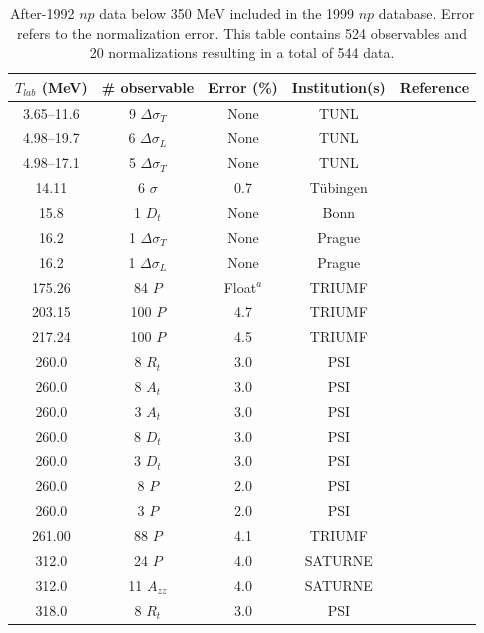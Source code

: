 \begin{table}
\caption{After-1992 $np$ data below 350 MeV included in the 1999 $np$ database.
Error refers to the normalization error. This table contains 524 observables
and 20 normalizations resulting in a total of 544 data.}
\begin{tabular}{ccccr}
                   
   $T_{lab}$ (MeV)
 & \# observable
 & Error (\%)
 & Institution(s)
 & Reference

\\
\hline                                                                          
3.65--11.6 & 9 $\Delta \sigma_T$ & None & TUNL & \cite{Wi95} \\
4.98--19.7 & 6 $\Delta \sigma_L$ & None & TUNL & \cite{Ra99} \\
4.98--17.1 & 5 $\Delta \sigma_T$ & None & TUNL & \cite{Ra99} \\
14.11      & 6 $\sigma$ & 0.7  & T\"ubingen & \cite{BM97} \\
15.8       & 1 $D_t$ & None & Bonn & \cite{Cl98} \\
16.2       & 1 $\Delta \sigma_T$ & None & Prague & \cite{Br96} \\
16.2       & 1 $\Delta \sigma_L$ & None & Prague & \cite{Br97} \\
175.26     & 84 $P$ & Float$^a$ & TRIUMF & \cite{Da96} \\
203.15     & 100 $P$ & 4.7 & TRIUMF & \cite{Da96} \\
217.24     & 100 $P$ & 4.5 & TRIUMF & \cite{Da96} \\
260.0     & 8 $R_t$ & 3.0 & PSI & \cite{Ah98} \\
260.0     & 8 $A_t$ & 3.0 & PSI & \cite{Ah98} \\
260.0     & 3 $A_t$ & 3.0 & PSI & \cite{Ah98} \\
260.0     & 8 $D_t$ & 3.0 & PSI & \cite{Ah98} \\
260.0     & 3 $D_t$ & 3.0 & PSI & \cite{Ah98} \\
260.0     & 8 $P  $ & 2.0 & PSI & \cite{Ah98} \\
260.0     & 3 $P  $ & 2.0 & PSI & \cite{Ah98} \\
261.00     &  88 $P$ & 4.1 & TRIUMF & \cite{Da96} \\
312.0     &  24 $P$ & 4.0 & SATURNE& \cite{Ba93} \\
312.0     &  11 $A_{zz}$ & 4.0 & SATURNE& \cite{Ba94} \\
318.0     & 8 $R_t$ & 3.0 & PSI & \cite{Ah98} \\

\end{tabular}
\end{table}
